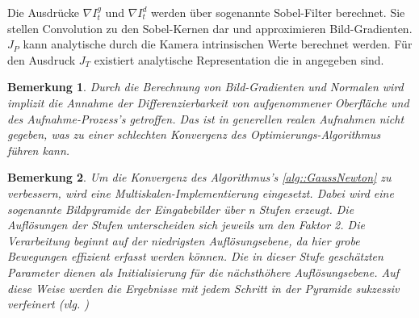 \documentclass[12pt,DIV=15,BCOR=15mm,twoside,headsepline,abstract=true,listof=totoc,bibliography=totoc]{scrreprt}
\newtheorem{remark}{Bemerkung}[chapter]
\theoremstyle{remark}    %
\begin{document}
    Die Ausdrücke  $\nabla I_t^g$ und $\nabla I_t^d$ werden über sogenannte Sobel-Filter berechnet. Sie stellen Convolution zu den Sobel-Kernen dar
    und approximieren Bild-Gradienten. $J_P$ kann analytische durch die Kamera intrinsischen Werte berechnet werden. Für den Ausdruck $J_T$ existiert analytische 
    Representation die in \cite{Forster_2017} angegeben sind.
    \begin{remark}\label{bem:diff}
    Durch die Berechnung von Bild-Gradienten und Normalen wird implizit die Annahme der Differenzierbarkeit von aufgenommener Oberfläche und 
    des Aufnahme-Prozess's getroffen. Das ist in generellen realen Aufnahmen nicht gegeben, was zu einer schlechten Konvergenz des Optimierungs-Algorithmus 
    führen kann.
    \end{remark}
    \begin{remark}\label{bem:multiscale}
    Um die Konvergenz des Algorithmus's \ref{alg::GaussNewton} zu verbessern, wird eine Multiskalen-Implementierung eingesetzt.
    Dabei wird eine sogenannte Bildpyramide der Eingabebilder über n Stufen erzeugt.
    Die Auflösungen der Stufen unterscheiden sich jeweils um den Faktor 2.
    Die Verarbeitung beginnt auf der niedrigsten Auflösungsebene, da hier grobe Bewegungen effizient erfasst werden können.
    Die in dieser Stufe geschätzten Parameter dienen als Initialisierung für die nächsthöhere Auflösungsebene.
    Auf diese Weise werden die Ergebnisse mit jedem Schritt in der Pyramide sukzessiv verfeinert (vlg. \cite{djema2023densevisualodometryusing,Zhou2018})
    \end{remark}
    
\end{document}
